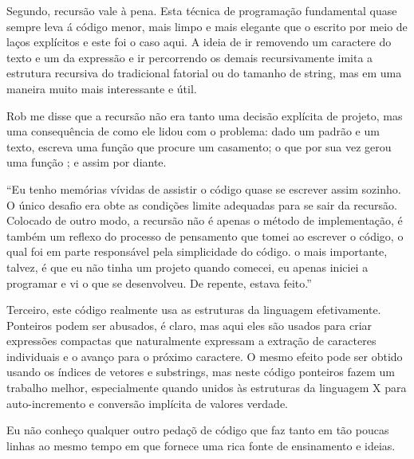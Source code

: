 Segundo, recursão vale à pena. Esta técnica de programação fundamental
quase sempre leva á código menor, mais limpo e mais elegante que o
escrito por meio de laços explícitos e este foi o caso aqui. A ideia
de ir removendo um caractere do texto e um da expressão e ir
percorrendo os demais recursivamente imita a estrutura recursiva do
tradicional fatorial ou do tamanho de string, mas em uma maneira muito
mais interessante e útil.

Rob me disse que a recursão não era tanto uma decisão explícita de
projeto, mas uma consequência de como ele lidou com o problema: dado
um padrão e um texto, escreva uma função que procure um casamento; o
que por sua vez gerou uma função ; e assim por
diante.

``Eu tenho memórias vívidas de assistir o código quase se escrever
assim sozinho. O único desafio era obte as condições limite adequadas
para se sair da recursão. Colocado de outro modo, a recursão não é
apenas o método de implementação, é também um reflexo do processo de
pensamento que tomei ao escrever o código, o qual foi em parte
responsável pela simplicidade do código. o mais importante, talvez, é
que eu não tinha um projeto quando comecei, eu apenas iniciei a
programar e vi o que se desenvolveu. De repente, estava feito.''

Terceiro, este código realmente usa as estruturas da linguagem
efetivamente. Ponteiros podem ser abusados, é claro, mas aqui eles são
usados para criar expressões compactas que naturalmente expressam a
extração de caracteres individuais e o avanço para o próximo
caractere. O mesmo efeito pode ser obtido usando os índices de vetores
e substrings, mas neste código ponteiros fazem um trabalho melhor,
especialmente quando unidos às estruturas da linguagem X para
auto-incremento e conversão implícita de valores verdade.

Eu não conheço qualquer outro pedaçõ de código que faz tanto em tão
poucas linhas ao mesmo tempo em que fornece uma rica fonte de
ensinamento e ideias.

\fim
